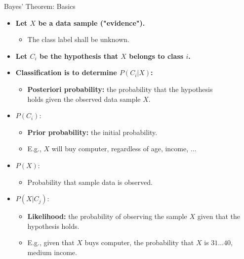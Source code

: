 \begin{frame}{Bayes' Theorem: Basics}
  \begin{itemize}
  \item \textbf{Let $X$ be a data sample ("evidence").}
    \begin{itemize}
    \item The class label shall be unknown.
    \end{itemize}
  \item \textbf{Let $C_i$ be the hypothesis that $X$ belongs to class $i$.}
  \item \textbf{Classification is to determine $P(C_i|X)$:}
    \begin{itemize}
    \item \textbf{\color{airforceblue}Posteriori probability:} the probability that the hypothesis \\ holds given the observed data sample $X$.
    \end{itemize}
  \item $P(C_i)$:
    \begin{itemize}
    \item \textbf{\color{airforceblue}Prior probability:} the initial probability.
    \item E.g., $X$ will buy computer, regardless of age, income, $\ldots$
    \end{itemize}
  \item $P(X)$:
    \begin{itemize}
    \item Probability that sample data is observed.
    \end{itemize}
  \item $P(X|C_j)$:
    \begin{itemize}
    \item \textbf{\color{airforceblue}Likelihood:} the probability of observing the sample $X$ given that the hypothesis holds.
    \item E.g., given that $X$ buys computer, the probability that $X$ is $31\ldots40$, medium income.
    \end{itemize}
  \end{itemize}
\end{frame}

